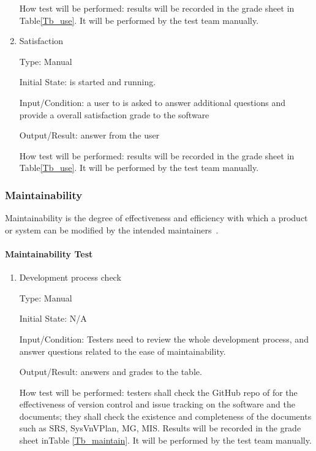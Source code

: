 \documentclass[12pt, titlepage]{article}
\begin{document}
\begin{enumerate}
How test will be performed: results will be recorded in the grade sheet in
Table\ref{Tb_use}. It will be performed by the test team manually.
					
\item{Satisfaction}

Type: Manual
					
Initial State: \progname{} is started and running.
					
Input/Condition: a user to \progname{} is asked to answer additional questions
and provide a overall satisfaction grade to the software
					
Output/Result: answer from the user
					
How test will be performed: results will be recorded in the grade sheet in
Table\ref{Tb_use}. It will be performed by the test team manually.

\end{enumerate}

\subsubsection{Maintainability}
\label{sec_Maintaintest} Maintainability is the degree of effectiveness and
efficiency with which a product or system can be modified by the intended
maintainers~\cite{ISO/IEC25010:2011}.

\paragraph{Maintainability Test}

\begin{enumerate}

\item{Development process check}

Type: Manual
					
Initial State: N/A
					
Input/Condition: Testers need to review the whole development process, and
answer questions related to the ease of maintainability.
					
Output/Result: answers and grades to the table.
					
How test will be performed: testers shall check the GitHub repo of \progname{}
for the effectiveness of version control and issue tracking on the software and
the documents; they shall check the existence and completeness of the documents
such as SRS, SysVnVPlan, MG, MIS. Results will be recorded in the grade sheet
inTable \ref{Tb_maintain}. It will be performed by the test team manually.
\end{enumerate}
\end{document}
